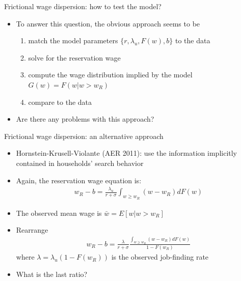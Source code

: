 \documentclass[9pt]{beamer}
\newcommand{\bit}{\begin{itemize}}
\newcommand{\eit}{\end{itemize}}
\newcommand{\ben}{\begin{enumerate}}
\newcommand{\een}{\end{enumerate}}
\begin{document}
\begin{frame}{Frictional wage dispersion: how to test the model?}

\bit
\setlength\itemsep{2em}

\item To answer this question, the obvious approach seems to be
\ben
\setlength\itemsep{0.5em}
	\item match the model parameters $\{r, \lambda_u, F(w), b\}$ to the data

	\item solve for the reservation wage
	
	\item compute the wage distribution implied by the model $G(w) = F(w | w>w_R)$
	
	\item compare to the data
\een

\item Are there any problems with this approach?

\eit


\end{frame}

\begin{frame}{Frictional wage dispersion: an alternative approach}

\bit
\setlength\itemsep{1.5em}

\item Hornstein-Krusell-Violante (AER 2011): use the information implicitly contained in households' search behavior

\item Again, the reservation wage equation is:
\begin{eqnarray}
w_R  -b = \frac{\lambda_u }{r+\sigma} \int_{w\geq w_R} (w-w_R) dF(w) \nonumber
\end{eqnarray}

\item The observed mean wage is $\bar w = E [w | w > w_R]$

\item Rearrange
\begin{eqnarray}
w_R  - b = \frac{\lambda}{r+\sigma} \frac{\int_{w\geq w_R} (w-w_R) dF(w)}{1-F(w_R)} \nonumber
\end{eqnarray}
where $\lambda = \lambda_u (1-F(w_R))$ is the observed job-finding rate

\item What is the last ratio?
\eit
\end{frame}
\end{document}
